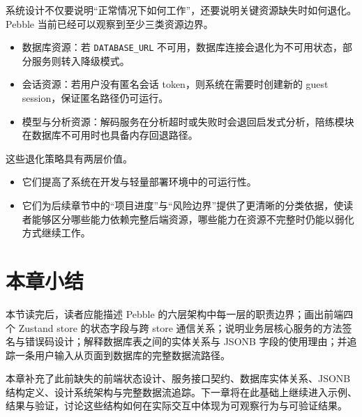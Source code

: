 系统设计不仅要说明“正常情况下如何工作”，还要说明关键资源缺失时如何退化。Pebble 当前已经可以观察到至少三类资源边界。

\begin{itemize}
  \item 数据库资源：若 \texttt{DATABASE\_URL} 不可用，数据库连接会退化为不可用状态，部分服务则转入降级模式。
  \item 会话资源：若用户没有匿名会话 token，则系统在需要时创建新的 guest session，保证匿名路径仍可运行。
  \item 模型与分析资源：解码服务在分析超时或失败时会退回启发式分析，陪练模块在数据库不可用时也具备内存回退路径。
\end{itemize}

这些退化策略具有两层价值。

\begin{itemize}
  \item 它们提高了系统在开发与轻量部署环境中的可运行性。
  \item 它们为后续章节中的“项目进度”与“风险边界”提供了更清晰的分类依据，使读者能够区分哪些能力依赖完整后端资源，哪些能力在资源不完整时仍能以弱化方式继续工作。
\end{itemize}

\section{本章小结}

本节读完后，读者应能描述 Pebble 的六层架构中每一层的职责边界；画出前端四个 Zustand store 的状态字段与跨 store 通信关系；说明业务层核心服务的方法签名与错误码设计；解释数据库表之间的实体关系与 JSONB 字段的使用理由；并追踪一条用户输入从页面到数据库的完整数据流路径。

本章补充了此前缺失的前端状态设计、服务接口契约、数据库实体关系、JSONB 结构定义、设计系统架构与完整数据流追踪。下一章将在此基础上继续进入示例、结果与验证，讨论这些结构如何在实际交互中体现为可观察行为与可验证结果。
